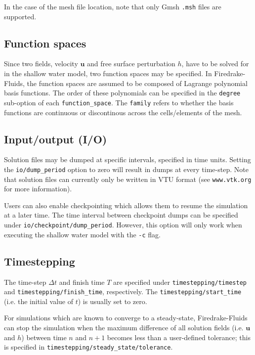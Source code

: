 \documentclass[a4paper,11pt]{report}
\begin{document}
In the case of the mesh file location, note that only Gmsh \texttt{.msh} files \citep{GeuzaineRemacle_2009} are supported.

\subsection{Function spaces}
Since two fields, velocity $\mathbf{u}$ and free surface perturbation $h$, have to be solved for in the shallow water model, two function spaces may be specified. In Firedrake-Fluids, the function spaces are assumed to be composed of Lagrange polynomial basis functions. The order of these polynomials can be specified in the \texttt{degree} sub-option of each \texttt{function\_space}. The \texttt{family} refers to whether the basis functions are continuous or discontinous across the cells/elements of the mesh.

\subsection{Input/output (I/O)}
Solution files may be dumped at specific intervals, specified in time units. Setting the \texttt{io/dump\_period} option to zero will result in dumps at every time-step. Note that solution files can currently only be written in VTU format (see \texttt{www.vtk.org} for more information).

Users can also enable checkpointing which allows them to resume the simulation at a later time. The time interval between checkpoint dumps can be specified under \texttt{io/checkpoint/dump\_period}. However, this option will only work when executing the shallow water model with the \texttt{-c} flag.

\subsection{Timestepping}
The time-step $\Delta t$ and finish time $T$ are specified under \texttt{timestepping/timestep} and \texttt{timestepping/finish\_time}, respectively. The \texttt{timestepping/start\_time} (i.e. the initial value of $t$) is usually set to zero.

For simulations which are known to converge to a steady-state, Firedrake-Fluids can stop the simulation when the maximum difference of all solution fields (i.e. $\mathbf{u}$ and $h$) between time $n$ and $n+1$ becomes less than a user-defined tolerance; this is specified in \texttt{timestepping/steady\_state/tolerance}.
\end{document}
